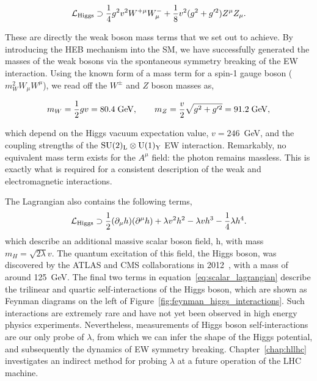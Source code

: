 \begin{equation}
    \mathcal{L}_{\rm{Higgs}} \supset \frac{1}{4}g^2v^2W^{+\mu}W^-_\mu + \frac{1}{8}v^2(g^2+g'^2)Z^{\mu}Z_\mu.
\end{equation}

\noindent
These are directly the weak boson mass terms that we set out to achieve. By introducing the HEB mechanism into the SM, we have successfully generated the masses of the weak bosons via the spontaneous symmetry breaking of the EW interaction. Using the known form of a mass term for a spin-1 gauge boson ($m_W^2 W_\mu W^\mu$), we read off the $W^{\pm}$ and $Z$ boson masses as,

\begin{equation}
    m_W = \frac{1}{2}gv = 80.4\;{\rm{GeV}}, \qquad m_Z = \frac{v}{2}\sqrt{g^2+g'^2} = 91.2\;{\rm{GeV}},
\end{equation}

\noindent
which depend on the Higgs vacuum expectation value, $v=246$~GeV, and the coupling strengths of the ${\rm{SU}(2)_{\rm{L}}}\otimes{\rm{U}}(1)_{\rm{Y}}$ EW interaction. Remarkably, no equivalent mass term exists for the $A^\mu$ field: the photon remains massless. This is exactly what is required for a consistent description of the weak and electromagnetic interactions.

The Lagrangian also contains the following terms,
\begin{equation}\label{eq:scalar_lagrangian}
    \mathcal{L}_{\rm{Higgs}} \supset \frac{1}{2}(\partial_\mu h)(\partial^\mu h) + \lambda v^2 h^2 -{\lambda}vh^3 -\frac{1}{4}\lambda h^4.
\end{equation}
\noindent
which describe an additional massive scalar boson field, h, with mass $m_H=\sqrt{2\lambda}v$. The quantum excitation of this field, the Higgs boson, was discovered by the ATLAS and CMS collaborations in 2012~\cite{Aad:2012tfa,Chatrchyan:2012xdj,Chatrchyan:2013lba}, with a mass of around 125~GeV. The final two terms in equation~\ref{eq:scalar_lagrangian} describe the trilinear and quartic self-interactions of the Higgs boson, which are shown as Feynman diagrams on the left of Figure~\ref{fig:feynman_higgs_interactions}. Such interactions are extremely rare and have not yet been observed in high energy physics experiments. Nevertheless, measurements of Higgs boson self-interactions are our only probe of $\lambda$, from which we can infer the shape of the Higgs potential, and subsequently the dynamics of EW symmetry breaking. Chapter~\ref{chap:hllhc} investigates an indirect method for probing $\lambda$ at a future operation of the LHC machine.


